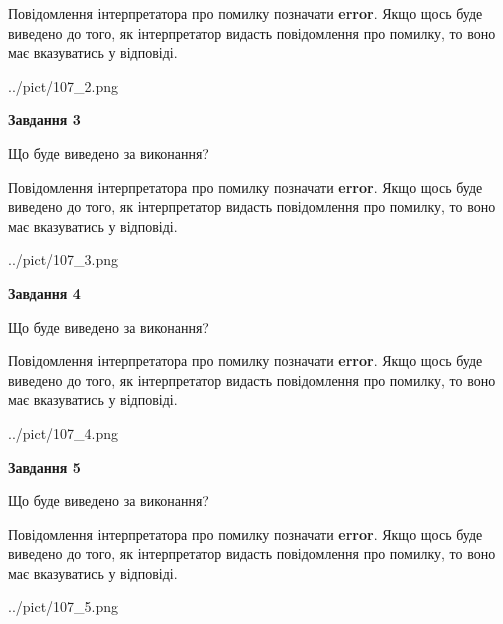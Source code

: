 \documentclass[12pt, ukrainian]{article}
\begin{document}
{\begin {large}
Повідомлення інтерпретатора про помилку позначати \textbf{error}.
Якщо щось буде виведено до того, як інтерпретатор видасть повідомлення про помилку, 
то воно має вказуватись у відповіді. \par


\begin{center}
	{../pict/107_2.png}
\end{center}
\newpage

{\begin {center}\textbf{Завдання 3}\end {center}}\par
Що буде виведено за виконання?

Повідомлення інтерпретатора про помилку позначати \textbf{error}.
Якщо щось буде виведено до того, як інтерпретатор видасть повідомлення про помилку, 
то воно має вказуватись у відповіді. \par


\begin{center}
	{../pict/107_3.png}
\end{center}
\newpage

{\begin {center}\textbf{Завдання 4}\end {center}}\par
Що буде виведено за виконання?

Повідомлення інтерпретатора про помилку позначати \textbf{error}.
Якщо щось буде виведено до того, як інтерпретатор видасть повідомлення про помилку, 
то воно має вказуватись у відповіді. \par


\begin{center}
	{../pict/107_4.png}
\end{center}
\newpage

{\begin {center}\textbf{Завдання 5}\end {center}}\par
Що буде виведено за виконання?

Повідомлення інтерпретатора про помилку позначати \textbf{error}.
Якщо щось буде виведено до того, як інтерпретатор видасть повідомлення про помилку, 
то воно має вказуватись у відповіді. \par


\begin{center}
	{../pict/107_5.png}
\end{center}
\newpage


\end{large}}
\end{document}
